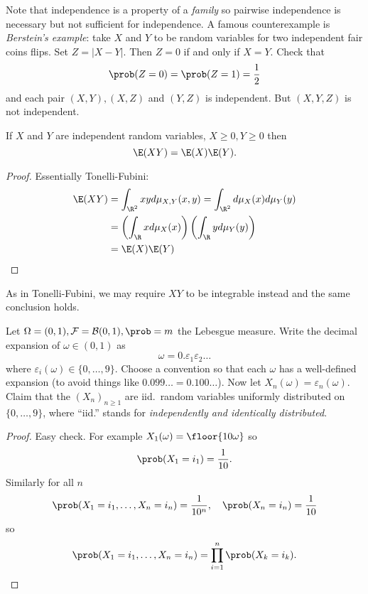\documentclass[a4paper]{article}
\renewcommand{\P}{\prob} %
\begin{document}
\begin{note}
  Note that independence is a property of a \emph{family} so pairwise independence is necessary but not sufficient for independence. A famous counterexample is \emph{Berstein's example}: take \(X\) and \(Y\) to be random variables for two independent fair coins flips. Set \(Z = |X - Y|\). Then \(Z = 0\) if and only if \(X = Y\). Check that
  \[
    \P(Z = 0) = \P(Z = 1) = \frac{1}{2}
  \]
  and each pair \((X, Y), (X, Z)\) and \((Y, Z)\) is independent. But \((X, Y, Z)\) is not independent.
\end{note}

\begin{proposition}
  If \(X\) and \(Y\) are independent random variables, \(X \geq 0, Y \geq 0\) then
  \[
    \E(XY) = \E(X) \E(Y).
  \]
\end{proposition}

\begin{proof}
  Essentially Tonelli-Fubini:
  \begin{align*}
    \E(XY) &= \int_{\R^2} xy d\mu_{X, Y} (x, y) = \int_{\R^2} d \mu_X(x) d \mu_Y(y) \\
           &= \left(\int_\R x d \mu_X(x) \right) \left(\int_\R y d \mu_Y(y) \right) \\
           &= \E(X) \E(Y)
  \end{align*}
\end{proof}

\begin{remark}
  As in Tonelli-Fubini, we may require \(XY\) to be integrable instead and the same conclusion holds.
\end{remark}

\begin{eg}
  Let \(\Omega = (0, 1), \mathcal F = \mathcal B(0, 1), \P = m\) the Lebesgue measure. Write the decimal expansion of \(\omega \in (0, 1)\) as
  \[
    \omega = 0. \varepsilon_1 \varepsilon_2 \dots
  \]
  where \(\varepsilon_i(\omega) \in \{0, \dots, 9\}\). Choose a convention so that each \(\omega\) has a well-defined expansion (to avoid things like \(0.099 \dots = 0.100\dots\)). Now let \(X_n(\omega) = \varepsilon_n(\omega)\). Claim that the \((X_n)_{n \geq 1}\) are iid.\ random variables uniformly distributed on \(\{0, \dots, 9\}\), where ``iid.'' stands for \emph{independently and identically distributed}.

  \begin{proof}
    Easy check. For example \(X_1(\omega) = \floor{10 \omega}\) so
    \[
      \P(X_1 = i_1) = \frac{1}{10}.
    \]
    Similarly for all \(n\)
    \[
      \P(X_1 = i_1, \dots, X_n = i_n) = \frac{1}{10^n}, \quad \P(X_n = i_n) = \frac{1}{10}
    \]
    so
    \[
      \P(X_1 = i_1, \dots, X_n = i_n) = \prod_{i = 1}^n \P(X_k = i_k).
    \]
  \end{proof}
\end{eg}
\end{document}
